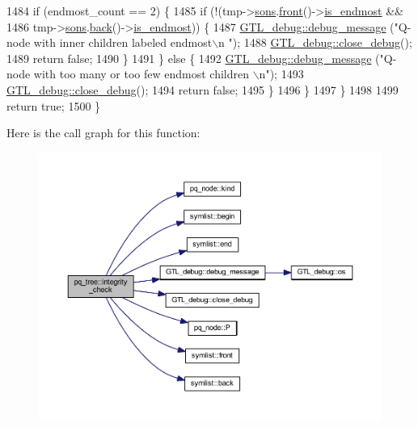 \begin{DoxyCode}
1484         \textcolor{keywordflow}{if} (endmost\_count == 2) \{
1485         \textcolor{keywordflow}{if} (!(tmp->\mbox{\hyperlink{classpq__node_a2cc030cfa4560872acea8b50ebd0542b}{sons}}.\mbox{\hyperlink{classsymlist_afd4b55616fc20033d4a47684551866e8}{front}}()->\mbox{\hyperlink{classpq__node_a058dda3d1197dfd2b343d1983d305d79}{is\_endmost}} && 
1486             tmp->\mbox{\hyperlink{classpq__node_a2cc030cfa4560872acea8b50ebd0542b}{sons}}.\mbox{\hyperlink{classsymlist_abc0570ff78ded9210ac26865519d36e3}{back}}()->\mbox{\hyperlink{classpq__node_a058dda3d1197dfd2b343d1983d305d79}{is\_endmost}})) \{
1487             \mbox{\hyperlink{class_g_t_l__debug_aca4c2fb24203b5fba5e4ffa9c2fa263f}{GTL\_debug::debug\_message}} (\textcolor{stringliteral}{"Q-node with inner children labeled endmost\(\backslash\)n
      "});
1488             \mbox{\hyperlink{class_g_t_l__debug_a18b39d8b303a59062f86702a01ab6a98}{GTL\_debug::close\_debug}}();
1489             \textcolor{keywordflow}{return} \textcolor{keyword}{false};
1490         \} 
1491         \} \textcolor{keywordflow}{else} \{
1492         \mbox{\hyperlink{class_g_t_l__debug_aca4c2fb24203b5fba5e4ffa9c2fa263f}{GTL\_debug::debug\_message}} (\textcolor{stringliteral}{"Q-node with too many or too few endmost children
      \(\backslash\)n"});
1493         \mbox{\hyperlink{class_g_t_l__debug_a18b39d8b303a59062f86702a01ab6a98}{GTL\_debug::close\_debug}}();
1494         \textcolor{keywordflow}{return} \textcolor{keyword}{false};
1495         \}
1496     \}
1497     \}
1498     
1499     \textcolor{keywordflow}{return} \textcolor{keyword}{true};
1500 \}
\end{DoxyCode}
Here is the call graph for this function\+:\nopagebreak
\begin{figure}[H]
\begin{center}
\leavevmode
\includegraphics[width=350pt]{classpq__tree_a170813af06d7b02083c3a7785e080de5_cgraph}
\end{center}
\end{figure}
